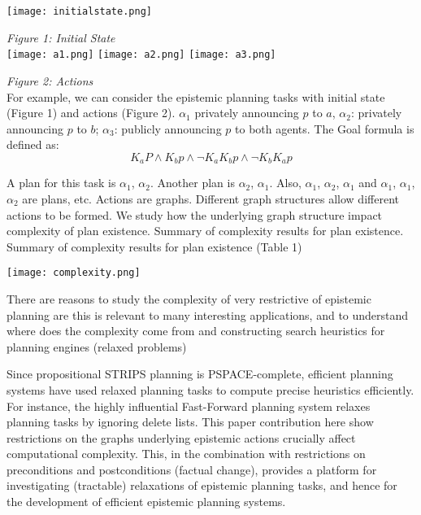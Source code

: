 \documentclass[10pt,legal]{article} %
\begin{document}
\begin{multicols}{2}
\texttt{[image: initialstate.png]}
\par\small\textit{Figure 1: Initial State}
\\
\texttt{[image: a1.png]}
\texttt{[image: a2.png]}
\texttt{[image: a3.png]} 
\par\small\textit{Figure 2: Actions}\\
For example, we can consider the epistemic planning tasks with initial state (Figure 1) and actions (Figure 2). $\alpha_1$ privately announcing $p$ to $a$,  $\alpha_2$: privately announcing $p$ to $b$; $\alpha_3$: publicly announcing $p$ to both agents. The Goal formula is defined as:
\begin{equation}
K_a P \wedge	 K_b p \wedge	 \neg K_a K_b p \wedge  \neg K_b K_a p
\end{equation}

A plan for this task is $\alpha_1$, $\alpha_2$. Another plan is $\alpha_2$, $\alpha_1$. Also, $\alpha_1$, $\alpha_2$, $\alpha_1$ and $\alpha_1$, $\alpha_1$, $\alpha_2$ are plans, etc. Actions are graphs. Different graph structures allow different actions to be formed. We study how the underlying graph structure impact complexity of plan existence. Summary of complexity results for plan existence. Summary of complexity results for plan existence (Table 1) \cite{e4e604b96afd4002b1aef671f4ffa495}
\begin{center}
\vspace{1pt}
\texttt{[image: complexity.png]} %
\vspace{1pt}
\end{center}
There are reasons to study the complexity of very restrictive of epistemic planning are this is relevant to many interesting applications, and to understand where does the complexity come from and constructing search heuristics for planning engines (relaxed problems)

Since propositional STRIPS planning is PSPACE-complete, efficient planning systems have used relaxed
planning tasks to compute precise heuristics efficiently. For instance, the highly influential Fast-Forward planning system relaxes planning tasks by ignoring delete lists. This paper contribution here show restrictions on the graphs underlying epistemic actions crucially affect computational complexity. This, in the combination with restrictions on preconditions and postconditions (factual change), provides a platform for investigating (tractable) relaxations of epistemic planning tasks, and hence for the development of efficient epistemic planning systems.
{}

\end{multicols}
\end{document}
